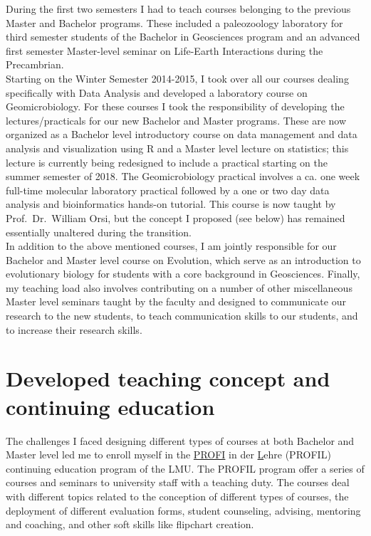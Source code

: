 \documentclass[a4paper,11pt]{article}
\begin{document}
During the first two semesters I had to teach courses belonging to the previous Master and Bachelor programs. These included a paleozoology laboratory for third semester students of the Bachelor in Geosciences program and an advanced first semester Master-level seminar on Life-Earth Interactions during the Precambrian.\\

Starting on the Winter Semester 2014-2015, I took over all our courses dealing specifically with Data Analysis and developed a laboratory course on Geomicrobiology. For these courses I took the responsibility of developing the lectures/practicals for our new Bachelor and Master programs. These are now organized as a Bachelor level introductory course on data management and data analysis and visualization using R and a Master level lecture on statistics; this lecture is currently being redesigned to include a practical starting on the summer semester of 2018. The Geomicrobiology practical involves a ca. one week full-time molecular laboratory practical followed by a one or two day data analysis and bioinformatics hands-on tutorial. This course is now taught by Prof.~Dr.~William Orsi, but the concept I proposed (see below) has remained essentially unaltered during the transition.\\

In addition to the above mentioned courses, I am jointly responsible for our Bachelor and Master level course on Evolution, which serve as an introduction to evolutionary biology for students with a core background in Geosciences. Finally, my teaching load also involves contributing on a number of other miscellaneous Master level seminars taught by the faculty and designed to communicate our research to the new students, to teach communication skills to our students, and to increase their research skills.

\section*{Developed teaching concept and continuing education}

The challenges I faced designing different types of courses at both Bachelor and Master level led me to enroll myself in the \underline{PROFI} in der \underline{L}ehre (PROFIL) continuing education program of the LMU. The PROFIL program offer a series of courses and seminars to university staff with a teaching duty. The courses deal with different topics related to the conception of different types of courses, the deployment of different evaluation forms, student counseling, advising, mentoring and coaching, and other soft skills like flipchart creation.
\end{document}
